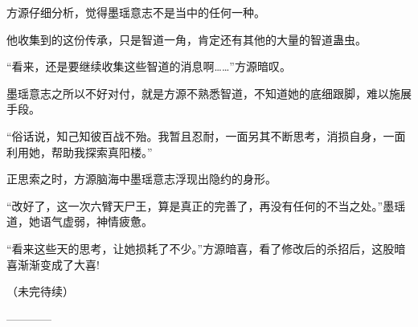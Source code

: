 \begin{this_body}
方源仔细分析，觉得墨瑶意志不是当中的任何一种。

他收集到的这份传承，只是智道一角，肯定还有其他的大量的智道蛊虫。

“看来，还是要继续收集这些智道的消息啊……”方源暗叹。

墨瑶意志之所以不好对付，就是方源不熟悉智道，不知道她的底细跟脚，难以施展手段。

“俗话说，知己知彼百战不殆。我暂且忍耐，一面另其不断思考，消损自身，一面利用她，帮助我探索真阳楼。”

正思索之时，方源脑海中墨瑶意志浮现出隐约的身形。

“改好了，这一次六臂天尸王，算是真正的完善了，再没有任何的不当之处。”墨瑶道，她语气虚弱，神情疲惫。

“看来这些天的思考，让她损耗了不少。”方源暗喜，看了修改后的杀招后，这股暗喜渐渐变成了大喜!

（未完待续）

------------

\end{this_body}

